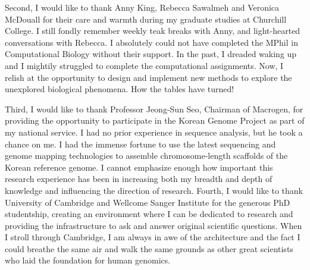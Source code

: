 \begin{acknowledgements}
Second, I would like to thank Anny King, Rebecca Sawalmeh and Veronica McDouall for their care and warmth during my graduate studies at Churchill College. I still fondly remember weekly teak breaks with Anny, and light-hearted conversations with Rebecca. I absolutely could not have completed the MPhil in Computational Biology without their support. In the past, I dreaded waking up and I mightily struggled to complete the computational assignments. Now, I relish at the opportunity to design and implement new methods to explore the unexplored biological phenomena. How the tables have turned!  

Third, I would like to thank Professor Jeong-Sun Seo, Chairman of Macrogen, for providing the opportunity to participate in the Korean Genome Project as part of my national service. I had no prior experience in sequence analysis, but he took a chance on me. I had the immense fortune to use the latest sequencing and genome mapping technologies to assemble chromosome-length scaffolds of the Korean reference genome. I cannot emphasize enough how important this research experience has been in increasing both my breadth and depth of knowledge and influencing the direction of research. 
Fourth, I would like to thank University of Cambridge and Wellcome Sanger Institute for the generous PhD studentship, creating an environment where I can be dedicated to research and providing the infrastructure to ask and answer original scientific questions. When I stroll through Cambridge, I am always in awe of the architecture and the fact I could breathe the same air and walk the same grounds as other great scientists who laid the foundation for human genomics.   


\end{acknowledgements}
